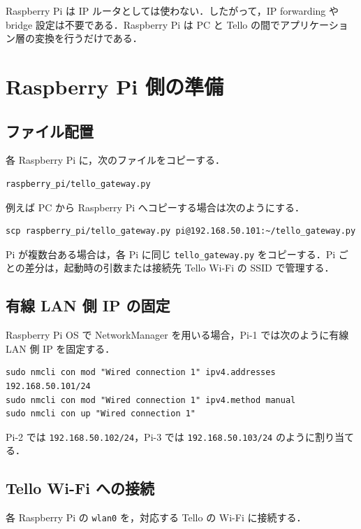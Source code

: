 Raspberry Pi は IP ルータとしては使わない．したがって，IP forwarding や bridge 設定は不要である．Raspberry Pi は PC と Tello の間でアプリケーション層の変換を行うだけである．

\section{Raspberry Pi 側の準備}
\label{sec:pi_setup}

\subsection{ファイル配置}

各 Raspberry Pi に，次のファイルをコピーする．

\begin{lstlisting}
raspberry_pi/tello_gateway.py
\end{lstlisting}

例えば PC から Raspberry Pi へコピーする場合は次のようにする．

\begin{lstlisting}
scp raspberry_pi/tello_gateway.py pi@192.168.50.101:~/tello_gateway.py
\end{lstlisting}

Pi が複数台ある場合は，各 Pi に同じ \texttt{tello\_gateway.py} をコピーする．Pi ごとの差分は，起動時の引数または接続先 Tello Wi-Fi の SSID で管理する．

\subsection{有線 LAN 側 IP の固定}

Raspberry Pi OS で NetworkManager を用いる場合，Pi-1 では次のように有線 LAN 側 IP を固定する．

\begin{lstlisting}
sudo nmcli con mod "Wired connection 1" ipv4.addresses 192.168.50.101/24
sudo nmcli con mod "Wired connection 1" ipv4.method manual
sudo nmcli con up "Wired connection 1"
\end{lstlisting}

Pi-2 では \texttt{192.168.50.102/24}，Pi-3 では \texttt{192.168.50.103/24} のように割り当てる．

\subsection{Tello Wi-Fi への接続}

各 Raspberry Pi の \texttt{wlan0} を，対応する Tello の Wi-Fi に接続する．

